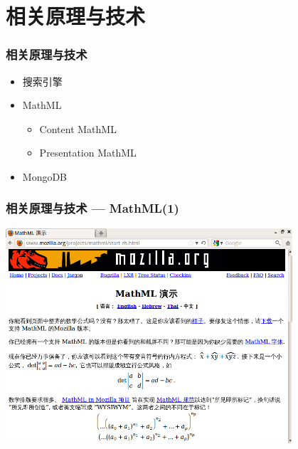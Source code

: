     \section{相关原理与技术}
    
    \begin{frame}
        \frametitle{相关原理与技术}
        
        \begin{itemize}
          \item<2-> 搜索引擎
          \item<4-> MathML
          \begin{itemize}
            \item<4-> Content MathML
            \item<4-> Presentation MathML
          \end{itemize}
          \item<3-> MongoDB
        \end{itemize}
    \end{frame}

    \begin{frame}
        \frametitle{相关原理与技术 --- MathML(1)}
        \begin{center}
            \includegraphics[width=0.8\textwidth]{pic/mathml1.png}
        \end{center}
    \end{frame}
    
